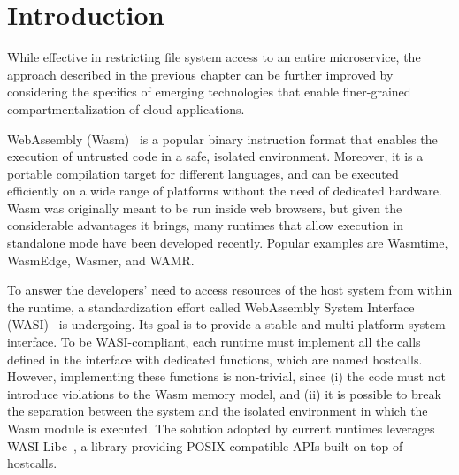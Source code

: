 \section{Introduction}\label{intro}

While effective in restricting file system access to an entire
microservice, the approach described in the previous chapter can be
further improved by considering the specifics of emerging technologies
that enable finer-grained compartmentalization of cloud applications.

WebAssembly (Wasm)~\cite{haas2017bringing} is a popular binary
instruction format that enables the execution of untrusted code in a
safe, isolated environment. Moreover, it is a portable compilation
target for different languages, and can be executed efficiently on a
wide range of platforms without the need of dedicated hardware. Wasm
was originally meant to be run inside web browsers, but given the
considerable advantages it brings, many runtimes that allow
execution in standalone mode have been developed recently. Popular
examples are Wasmtime, WasmEdge, Wasmer, and WAMR.

To answer the developers' need to access resources of the host
system from within the runtime, a standardization effort called
WebAssembly System Interface (WASI)~\cite{wasi} is undergoing.
Its goal is to provide a stable and multi-platform system interface. To be WASI-compliant, each runtime must implement
all the calls defined in the interface with dedicated functions, which
are named hostcalls. However, implementing these functions is
non-trivial, since (i) the code must not introduce violations to the
Wasm memory model, and (ii) it is possible to break the separation
between the system and the isolated environment in which the Wasm module is
executed. The solution adopted by current runtimes leverages
WASI Libc~\cite{wasi-libc}, a library providing POSIX-compatible APIs
built on top of hostcalls.

